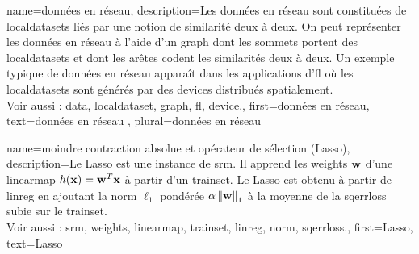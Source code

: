 {name={données en réseau},
	description={Les données en réseau sont constituées de \glspl{localdataset} 
		liés par une notion de similarité deux à deux. On peut représenter les données en réseau 
		à l’aide d’un \gls{graph} dont les sommets portent des \glspl{localdataset} et dont les arêtes 
		codent les similarités deux à deux. Un exemple typique de données en réseau apparaît dans les applications d'\gls{fl} 
		où les \glspl{localdataset} sont générés par des \glspl{device} distribués spatialement.
		\\
		Voir aussi : \gls{data}, \gls{localdataset}, \gls{graph}, \gls{fl}, \gls{device}.}, 
	first={données en réseau},
	text={données en réseau}  , plural={données en réseau}
}

{name={moindre contraction absolue et opérateur de sélection (Lasso)}, 
	description={Le Lasso est une 
		instance de \gls{srm}. Il apprend les \gls{weights} ${\bf w}$ d'une \gls{linearmap} 
		$h({\bf x}) = {\bf w}^{T} {\bf x}$ à partir d'un \gls{trainset}. 
		Le Lasso est obtenu à partir de \gls{linreg} en ajoutant la \gls{norm} $\ell_{1}$ 
		pondérée $\alpha \left\Vert {{\bf w}} \right\Vert_{1}$ à la moyenne de la \gls{sqerrloss} subie sur le \gls{trainset}. 
		\\
		Voir aussi : \gls{srm}, \gls{weights}, \gls{linearmap}, \gls{trainset}, \gls{linreg}, \gls{norm}, \gls{sqerrloss}.},
	first={Lasso},
	text={Lasso} 
}

